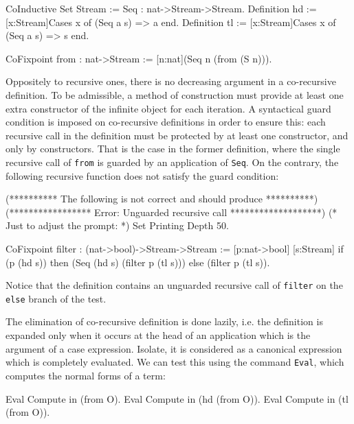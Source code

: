 \begin{coq_example*}
CoInductive Set Stream  := Seq : nat->Stream->Stream.
Definition hd  := [x:Stream]Cases x of (Seq a s) => a  end.
Definition tl  := [x:Stream]Cases x of (Seq a s) => s  end.
\end{coq_example*}
\begin{coq_example}
CoFixpoint from  : nat->Stream := [n:nat](Seq n (from (S n))).
\end{coq_example}

Oppositely to recursive ones, there is no decreasing argument in a
co-recursive definition. To be admissible, a method of construction
must provide at least one extra constructor of the infinite object for
each iteration. A syntactical guard condition is imposed on
co-recursive definitions in order to ensure this: each recursive call
in the definition must be protected by at least one constructor, and
only by constructors. That is the case in the former definition, where
the single recursive call of \texttt{from} is guarded by an
application of \texttt{Seq}. On the contrary, the following recursive
function does not satisfy the guard condition:

\begin{coq_eval}
(********** The following is not correct and should produce **********)
(***************** Error: Unguarded recursive call *******************)
(* Just to adjust the prompt: *) Set Printing Depth 50.
\end{coq_eval}
\begin{coq_example*}
CoFixpoint filter  : (nat->bool)->Stream->Stream := 
   [p:nat->bool]
     [s:Stream]
       if (p (hd s)) then (Seq (hd s) (filter p (tl s)))
       else (filter p (tl s)).
\end{coq_example*}

\noindent Notice that the definition contains an unguarded recursive
call of \texttt{filter} on the \texttt{else} branch of the test.

The elimination of co-recursive definition is done lazily, i.e. the
definition is expanded only when it occurs at the head of an
application which is the argument of a case expression.  Isolate, it
is considered as a canonical expression which is completely
evaluated. We can test this using the command \texttt{Eval},
which computes the normal forms of a term:

\begin{coq_example}
Eval Compute in (from O).
Eval Compute in (hd (from O)).
Eval Compute in (tl (from O)).  
\end{coq_example}

